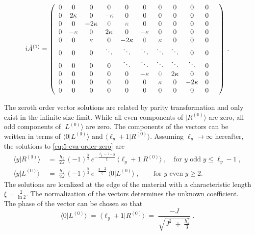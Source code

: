 \begin{equation}
  \im \tilde{A}^{(1)} = 
   \left(
\begin{array}{cccccccccccc}
 0 &0  & 0 & 0 & 0 & 0 & 0 & 0 & 0 & 0 %
 \\
0 & 2 \kappa  & 0 & \textcolor{black!60}{- \kappa}  & 0 & 0 & 0 & 0 & 0 & 0%
 \\
 0 & 0 & -2\kappa  & \textcolor{black!60}{0} &  \textcolor{black!60}{\kappa}  & 0 & 0 & 0 & 0 & 0%
 \\
 0 & \textcolor{black!60}{- \kappa}  & \textcolor{black!60}{0} & 2\kappa  &0 & \textcolor{black!60}{- \kappa}  & 0 & 0 & 0 & 0%
 \\
 0 & 0 &  \textcolor{black!60}{\kappa}  & 0 & -2\kappa  & \textcolor{black!60}{0} &  \textcolor{black!60}{\kappa}  & 0 & 0 & 0 %
 \\
 0 & 0 & 0 & \ddots  &  \ddots & \ddots  & \ddots & \ddots  & 0 & 0%
 \\
 0 & 0 & 0 & 0 & \ddots & \ddots & \ddots  & \ddots &  \ddots  & 0 & %
 \\ 
0 & 0 & 0 & 0 & 0 & \textcolor{black!60}{- \kappa}  & \textcolor{black!60}{0}& 2\kappa  &0 & 0 \\
0 & 0 & 0 & 0 & 0 & 0 &  \textcolor{black!60}{\kappa}  &0 & -2\kappa  & 0  \\
0 & 0 & 0 & 0 & 0 & 0 & 0 & 0 & 0  & 0 \\
\end{array}
\right) \, .
\end{equation}





The zeroth order vector solutions  are related by parity transformation and only exist in the infinite size limit. While all even components of $\vert R^{(0)} \rangle$ are zero, all odd components of $\vert L^{(0)} \rangle$ are zero. The components of the vectors can be written in terms of $\langle 0 \vert L^{(0)} \rangle$ and $\langle \ell_y+1 \vert R^{(0)} \rangle$. Assuming $\ell_y \to \infty$ hereafter, the solutions to \eqref{eq:5-eva-order-zero} are 
\begin{align}
    \langle y \vert R^{(0)} \rangle \; &= \;  \frac{h_z}{2J} \, (-1)^{\frac{y}{2}} \,  e^{-\frac{\ell_y-1-y}{\xi}}\,\langle \ell_y+1 \vert R^{(0)} \rangle \; ,  \quad \text{for } y  \text{ odd} \; y \leq \ell_y-1 \; , \\
    \langle y \vert L^{(0)} \rangle \; &= \;  \frac{h_z}{2J} \, (-1)^{\frac{y}{2}} \,  e^{-\frac{y-2}{\xi}}\,\langle 0 \vert L^{(0)} \rangle \; ,  \qquad \text{for } y  \text{ even} \; y \geq 2 .
\end{align}
The solutions are localized at the edge of the material with a characteristic length $\xi = \frac{2}{\ln 2}$. The normalization of the vectors determines the unknown coefficient. The phase of the vector can be chosen so that
\begin{equation}
    \langle 0 \vert L^{(0)} \rangle \; =  \; \langle \ell_y+1 \vert R^{(0)} \rangle \; = \; \frac{-J}{\sqrt{J^2 \; + \; \frac{h_z^2}{3}}} \; .
\end{equation}

